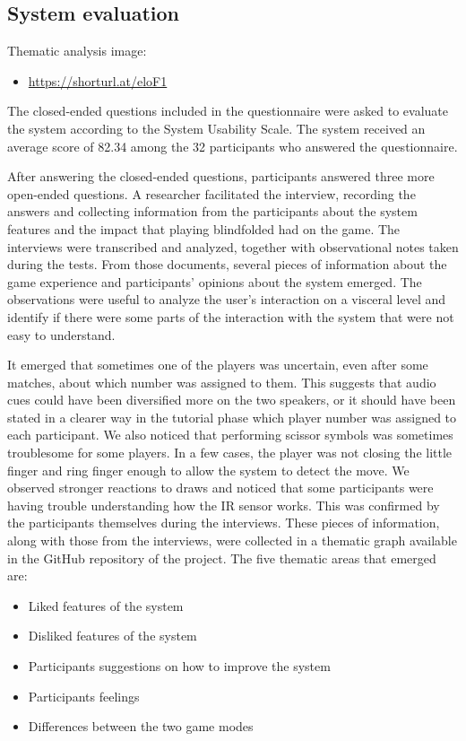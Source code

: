 \documentclass[11pt,a4paper]{report}
\begin{document}
\subsection*{System evaluation}
Thematic analysis image:
\begin{itemize}
  \item \url{https://shorturl.at/eloF1}
\end{itemize}

\noindent The closed-ended questions included in the questionnaire were asked to evaluate the system according to the System Usability Scale. The system received an average score of 82.34 among the 32 participants who answered the questionnaire.

After answering the closed-ended questions, participants answered three more open-ended questions. A researcher facilitated the interview, recording the answers and collecting information from the participants about the system features and the impact that playing blindfolded had on the game. The interviews were transcribed and analyzed, together with observational notes taken during the tests. From those documents, several pieces of information about the game experience and participants' opinions about the system emerged. The observations were useful to analyze the user's interaction on a visceral level and identify if there were some parts of the interaction with the system that were not easy to understand.

It emerged that sometimes one of the players was uncertain, even after some matches, about which number was assigned to them. This suggests that audio cues could have been diversified more on the two speakers, or it should have been stated in a clearer way in the tutorial phase which player number was assigned to each participant. We also noticed that performing scissor symbols was sometimes troublesome for some players. In a few cases, the player was not closing the little finger and ring finger enough to allow the system to detect the move. We observed stronger reactions to draws and noticed that some participants were having trouble understanding how the IR sensor works. This was confirmed by the participants themselves during the interviews. These pieces of information, along with those from the interviews, were collected in a thematic graph available in the GitHub repository of the project. 
The five thematic areas that emerged are: 
\begin{itemize}
  \item Liked features of the system
  \item Disliked features of the system
  \item Participants suggestions on how to improve the system
  \item Participants feelings
  \item Differences between the two game modes
\end{itemize}
\end{document}
